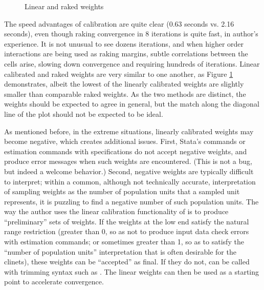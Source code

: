 \bigskip

\begin{stlog}
\nullskip
\end{stlog}

\begin{figure}[hb!]
    \begin{center}
    \end{center}
    \caption{Linear and raked weights}
    \label{fig:linear:raked}
\end{figure}

\clearpage

The speed advantages of  calibration are quite clear (0.63 seconds vs. 2.16 seconds),
even though raking convergence in 8 iterations is quite fast, in author's experience.
It is not unusual to see dozens iterations, and when higher order interactions are being used as
raking margins, subtle correlations between the cells arise, slowing down convergence and requiring
hundreds of iterations.
Linear calibrated and raked weights are very similar to one another, as Figure \ref{fig:linear:raked}
demonstrates, albeit the lowest of the linearly
calibrated weights are slightly smaller than comparable raked weights.
As the two methods are distinct, the weights should be expected to agree in general,
but the match along the diagonal line of the plot should not be expected to be ideal.

As mentioned before, in the extreme situations, linearly calibrated weights
may become negative, which creates additional issues.  First, Stata's 
commands or estimation commands with  specifications do not accept
negative weights, and produce error messages when such weights are encountered.
(This is not a bug, but indeed a welcome behavior.) Second, negative weights are
typically difficult to interpret; within a common, although not technically accurate,
interpretation of sampling weights as the number of population units that a sampled
unit represents, it is puzzling to find a negative number of such population units.
The way the author uses the linear calibration functionality of 
is to produce ``preliminary'' sets of weights. If the weights at the low end
satisfy the natural range restriction (greater than 0, so as not to produce
input data check errors with estimation commands; or sometimes greater than 1,
so as to satisfy the ``number of population units'' interpretation that is often
desirable for the clinets), these weights can be ``accepted'' as final. If they do not,
 can be called with trimming syntax such as .
The linear weights can then be used as a starting point to accelerate convergence.


